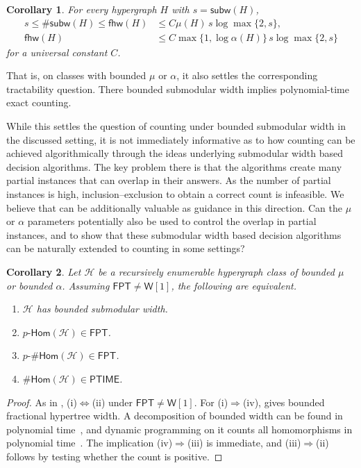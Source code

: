 \documentclass[11pt,letterpaper]{article}
\newtheorem{corollary}[corollary]{Corollary}
\theoremstyle{definition}
\theoremstyle{remark}
\newcommand{\cH}{\mathcal H}
\newcommand{\pHom}{p\text{-}\mathsf{Hom}}
\newcommand{\fhw}{\mathsf{fhw}}
\newcommand{\subw}{\mathsf{subw}}
\newcommand{\sharpsubw}{\mathsf{\#subw}}
\newcommand{\FPT}{\ensuremath{\mathsf{FPT}}}
\newcommand{\PTIME}{\mathsf{PTIME}}
\newcommand{\wone}{\ensuremath{\mathsf{W}[1]}}
\providecommand{\subw}{\operatorname{subw}}
\providecommand{\fhw}{\operatorname{fhw}}
\providecommand{\FPT}{\ensuremath{\mathsf{FPT}}}
\providecommand{\PTIME}{\mathsf{PTIME}}
\begin{document}
\begin{corollary}
\label{cor:stoc-sharp-submodular-width}
For every hypergraph $H$ with $s=\subw(H)$,
\[
 \begin{aligned}
 s\le\sharpsubw(H)\le\fhw(H)&\le C\mu(H)\,s\log\max\{2,s\},\\
 \fhw(H)&\le C\max\{1,\log\alpha(H)\}\,s\log\max\{2,s\}
 \end{aligned}
\]
for a universal constant $C$.
\end{corollary}

%
%
%
%

That is, on classes with bounded $\mu$ or $\alpha$, it also settles the corresponding tractability question. There bounded submodular width implies polynomial-time exact counting.

While this settles the question of counting under bounded submodular width in the discussed setting, it is not immediately informative as to how counting can be achieved algorithmically through the ideas underlying submodular width based decision algorithms. The key problem there is that the algorithms create many partial instances that can overlap in their answers. As the number of partial instances is high, inclusion--exclusion to obtain a correct count is infeasible. We believe that  can be additionally valuable as guidance in this direction. Can the $\mu$ or $\alpha$ parameters potentially also be used to control the overlap in partial instances, and to show that these submodular width based decision algorithms can be naturally extended to counting in some settings?


\begin{corollary}
\label{cor:bounded-lambda-counting}
Let $\cH$ be a recursively enumerable hypergraph class of bounded
$\mu$ or bounded $\alpha$. Assuming $\FPT\ne \wone$, the following are equivalent.
\begin{enumerate}[label=(\roman*)]
 \item $\cH$ has bounded submodular width.
 \item $\pHom(\cH)\in\FPT$.
 \item $p\text{-}\mathsf{\#Hom}(\cH)\in\FPT$.
 \item $\mathsf{\#Hom}(\cH)\in\PTIME$.
\end{enumerate}
\end{corollary}

\begin{proof}
As in , (i)$\Leftrightarrow$(ii) under $\FPT\ne \wone$.
For (i)$\Rightarrow$(iv),  gives bounded
fractional hypertree width. A decomposition of bounded width can be
found in polynomial time~\cite{MarxFHW2010}, and dynamic programming
on it counts all homomorphisms in polynomial
time~\cite{PichlerSkritek2013,DurandMengel2015}.
The implication (iv)$\Rightarrow$(iii) is immediate, and
(iii)$\Rightarrow$(ii) follows by testing whether the count is positive.
\end{proof}
\end{document}
